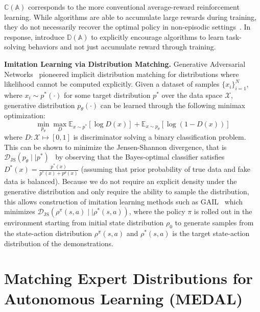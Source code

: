 \documentclass[nohyperref]{article}
\theoremstyle{plain}
\theoremstyle{definition}
\theoremstyle{remark}
\begin{document}
$\mathbb{C}(\mathbb{A})$ corresponds to the more conventional average-reward reinforcement learning. While algorithms are able to accumulate large rewards during training, they do not necessarily recover the optimal policy in non-episodic settings~\citep{zhu20ingredients, co2020ecological, sharma2021autonomous}. In response, \citet{sharma2021autonomous} introduce $\mathbb{D}(\mathbb{A})$ to explicitly encourage algorithms to learn task-solving behaviors and not just accumulate reward through training.

\textbf{Imitation Learning via Distribution Matching.} Generative Adversarial Networks~\citep{goodfellow2016nips} pioneered implicit distribution matching for distributions where likelihood cannot be computed explicitly. Given a dataset of samples $\{x_i\}_{i=1}^N$, where $x_i \sim p^*(\cdot)$ for some target distribution $p^*$ over the data space $\mathcal{X}$, generative distribution $p_\theta(\cdot)$ can be learned through the following minimax optimization:
\begin{equation}
    \min_{p_\theta} \max_{D} \mathbb{E}_{x \sim p^*} \left[\log D(x)\right] + \mathbb{E}_{x \sim p_\theta} \left[\log(1-D(x)) \right]
\end{equation}
where $D: \mathcal{X} \mapsto [0, 1]$ is discriminator solving a binary classification problem. This can be shown to minimize the Jensen-Shannon divergence, that is $\mathcal{D}_{\textrm{JS}}(p_\theta \mid\mid p^*)$~\citep{goodfellow2014generative,nowozin2016f} by observing that the Bayes-optimal classifier satisfies $D^*(x) = \frac{p^*(x)}{p^*(x) + p^\theta(x)}$ (assuming that prior probability of true data and fake data is balanced). Because we do not require an explicit density under the generative distribution and only require the ability to sample the distribution, this allows construction of imitation learning methods such as GAIL~\cite{ho2016generative} which minimizes $\mathcal{D}_{\textrm{JS}}(\rho^\pi(s, a) \mid\mid \rho^*(s, a))$, where the policy $\pi$ is rolled out in the environment starting from initial state distribution $\rho_0$ to generate samples from the state-action distribution $\rho^\pi(s, a)$ and $\rho^*(s, a)$ is the target state-action distribution of the demonstrations.











\section{Matching Expert Distributions for Autonomous Learning (MEDAL)}
\label{sec:medal}
\end{document}
